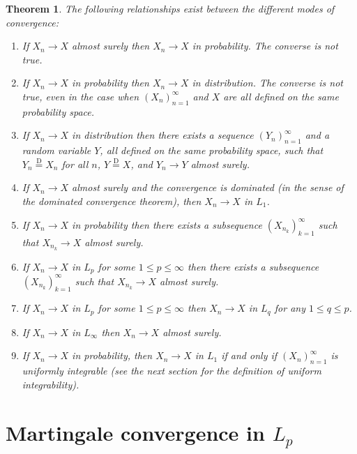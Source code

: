\documentclass[11pt]{report}
\theoremstyle{plain}
\newtheorem{thm}{Theorem}[chapter]
\theoremstyle{definition}
\begin{document}
\begin{thm}
The following relationships exist between the
different modes of convergence:

\begin{enumerate}[label=\arabic*.]
\item If $X_n\to X$ almost surely then $X_n\to X$ in
probability. The converse is not true.

\item If $X_n\to X$ in probability then $X_n \to X$ in
distribution. The converse is not true, even in the
case when $(X_n)_{n=1}^\infty$ and $X$ are all
defined on the same probability space.

\item If $X_n\to X$ in distribution then there exists a
sequence $(Y_n)_{n=1}^\infty$ and a random variable
$Y$, all defined on the same probability space, such
that $Y_n \stackrel{\textrm{D}}{=} X_n$ for all $n$,
$Y\stackrel{\textrm{D}}{=} X$, and $Y_n\to Y$ almost
surely.

\item If $X_n\to X$ almost surely and the convergence is
dominated (in the sense of the dominated convergence
theorem), then $X_n\to X$ in $L_1$.

\item If $X_n\to X$ in probability then there exists a
subsequence $(X_{n_k})_{k=1}^\infty$ such that
$X_{n_k}\to X$ almost surely.

\item If $X_n\to X$ in $L_p$ for some $1\le p \le\infty$
then there exists a subsequence
$(X_{n_k})_{k=1}^\infty$ such that $X_{n_k}\to X$
almost surely.

\item If $X_n\to X$ in $L_p$ for some $1\le p\le\infty$
then $X_n\to X$ in $L_q$ for any $1\le q\le p$.

\item If $X_n \to X$ in $L_\infty$ then $X_n\to X$ almost
surely.

\item If $X_n\to X$ in probability, then $X_n\to X$ in $L_1$
if and only if $(X_n)_{n=1}^\infty$ is uniformly
integrable (see the next section for the definition of
uniform integrability).
\end{enumerate}

\end{thm}

\section{Martingale convergence in $L_p$}
\end{document}
